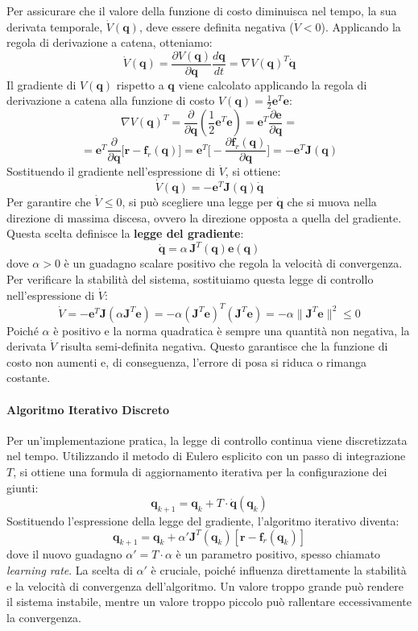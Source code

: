 ﻿\documentclass[11pt, a4paper]{article}
\begin{document}
Per assicurare che il valore della funzione di costo diminuisca nel tempo, la sua derivata temporale, \(\dot{V}(\bm{q})\), deve essere definita negativa (\(\dot{V} < 0\)). Applicando la regola di derivazione a catena, otteniamo:
\[
    \dot{V}(\bm{q}) = \frac{\partial V(\bm{q})}{\partial \bm{q}} \frac{d\bm{q}}{dt} = \nabla V(\bm{q})^T \dot{\bm{q}}
\]
Il gradiente di \(V(\bm{q})\) rispetto a \(\bm{q}\) viene calcolato applicando la regola di derivazione a catena alla funzione di costo \(V(\bm{q}) = \frac{1}{2} \bm{e}^T \bm{e}\):
\[
    \nabla V(\bm{q})^T = \frac{\partial}{\partial \bm{q}} \left( \frac{1}{2} \bm{e}^T \bm{e} \right) = \bm{e}^T \frac{\partial \bm{e}}{\partial \bm{q}} =
\]
\[
    = \bm{e}^T\frac{\partial}{\partial \bm{q}} \biggl[\bm{r} - \bm{f}_r(\bm{q}) \biggr] = \bm{e}^T \biggl[- \frac{\partial \bm{f}_r(\bm{q})}{\partial \bm{q}} \biggr] = - \bm{e}^T \bm{J}(\bm{q})
\]
Sostituendo il gradiente nell'espressione di \(\dot{V}\), si ottiene:
\[
    \dot{V}(\bm{q}) = - \bm{e}^T \bm{J}(\bm{q}) \dot{\bm{q}}
\]
Per garantire che \(\dot{V} \le 0\), si può scegliere una legge per \(\dot{\bm{q}}\) che si muova nella direzione di massima discesa, ovvero la direzione opposta a quella del gradiente. Questa scelta definisce la \textbf{legge del gradiente}:
\[
    \dot{\bm{q}} = \alpha \, \bm{J}^T(\bm{q}) \bm{e}(\bm{q})
\]
dove \(\alpha > 0\) è un guadagno scalare positivo che regola la velocità di convergenza. Per verificare la stabilità del sistema, sostituiamo questa legge di controllo nell'espressione di \(\dot{V}\):
\[
    \dot{V} = - \bm{e}^T \bm{J} (\alpha \bm{J}^T \bm{e}) = - \alpha (\bm{J}^T \bm{e})^T (\bm{J}^T \bm{e}) = - \alpha \| \bm{J}^T \bm{e} \|^2 \leq 0
\]
Poiché \(\alpha\) è positivo e la norma quadratica è sempre una quantità non negativa, la derivata \(\dot{V}\) risulta semi-definita negativa. Questo garantisce che la funzione di costo non aumenti e, di conseguenza, l'errore di posa si riduca o rimanga costante.

\paragraph{Algoritmo Iterativo Discreto}
Per un'implementazione pratica, la legge di controllo continua viene discretizzata nel tempo. Utilizzando il metodo di Eulero esplicito con un passo di integrazione \(T\), si ottiene una formula di aggiornamento iterativa per la configurazione dei giunti:
\[
    \bm{q}_{k+1} = \bm{q}_k + T \cdot \dot{\bm{q}}(\bm{q}_k)
\]
Sostituendo l'espressione della legge del gradiente, l'algoritmo iterativo diventa:
\[
    \bm{q}_{k+1} = \bm{q}_k + \alpha' \bm{J}^T(\bm{q}_k) \left[ \bm{r} - \bm{f}_r(\bm{q}_k) \right]
\]
dove il nuovo guadagno \(\alpha' = T \cdot \alpha\) è un parametro positivo, spesso chiamato \textit{learning rate}. La scelta di \(\alpha'\) è cruciale, poiché influenza direttamente la stabilità e la velocità di convergenza dell'algoritmo. Un valore troppo grande può rendere il sistema instabile, mentre un valore troppo piccolo può rallentare eccessivamente la convergenza.
\end{document}
